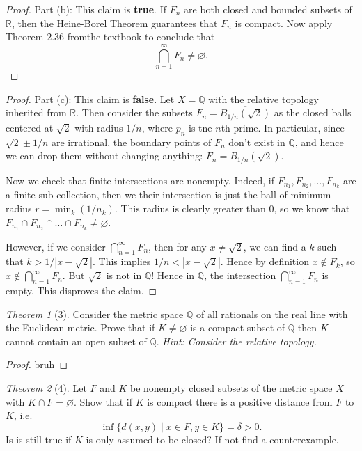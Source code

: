 \documentclass[12pt]{article}
\theoremstyle{remark}
\theoremstyle{named}
\newtheorem*{theorem}{Theorem}
\begin{document}
\begin{proof}
    Part (b): This claim is \textbf{true}. If \(F_n\) are both closed and bounded subsets of \(\mathbb R\), then the Heine-Borel Theorem guarantees that \(F_n\) is compact. Now apply Theorem 2.36 fromthe textbook to conclude that 
    \[\bigcap_{n = 1}^\infty F_n \neq \varnothing.\]
\end{proof}

\begin{proof}
    Part (c): This claim is \textbf{false}. Let \(X = \mathbb Q\) with the relative topology inherited from \(\mathbb R\). Then consider the subsets \(F_n = \overline{B_{1/ n}(\sqrt 2)}\) as the closed balls centered at \(\sqrt 2\) with radius \(1 / n\), where \(p_n\) is tne \(n\)th prime. 
    In particular, since \(\sqrt 2 \pm 1 / n\) are irrational, the boundary points of \(F_n\) don't exist in \(\mathbb Q\), and hence we can drop them without changing anything: \(F_n = B_{1/n}(\sqrt 2)\).

    Now we check that finite intersections are nonempty. Indeed, if \(F_{n_1}, F_{n_2}, \dots, F_{n_k}\) are a finite sub-collection, then we their intersection is just the ball of minimum radius \(r = \min_{k} (1/n_k)\). This radius is clearly greater than \(0\), so we know that \(F_{n_1} \cap F_{n_2} \cap \dots \cap F_{n_k} \neq \varnothing\).

    However, if we consider \(\bigcap_{n = 1}^\infty F_n\), then for any \(x \neq \sqrt 2\), we can find a \(k\) such that \(k > 1 / |x - \sqrt 2|\). This implies \(1 / n < |x - \sqrt 2|\). Hence by definition \(x \notin F_k\), so \(x \notin \bigcap_{n = 1}^\infty F_n\). But \(\sqrt 2\) is not in \(\mathbb Q\)! Hence in \(\mathbb Q\), the intersection \(\bigcap_{n = 1}^\infty F_n\) is empty. This disproves the claim.
\end{proof}

\begin{theorem}[3]
    Consider the metric space \(\mathbb Q\) of all rationals on the real line with the Euclidean metric. Prove that if \(K \neq \varnothing\) is a compact subset of \(\mathbb Q\) then \(K\) cannot contain an open subset of \(\mathbb Q\). \textit{Hint: Consider the relative topology.}
\end{theorem}

\begin{proof}
    bruh
\end{proof}

\begin{theorem}[4]
    Let \(F\) and \(K\) be nonempty closed subsets of the metric space \(X\) with \(K \cap F = \varnothing\). Show that if \(K\) is compact there is a positive distance from \(F\) to \(K\), i.e.
    \[\inf \{d(x, y) \mid x \in F, y \in K\} = \delta > 0.\]
    Is is still true if \(K\) is only assumed to be closed? If not find a counterexample.
\end{theorem}
\end{document}
